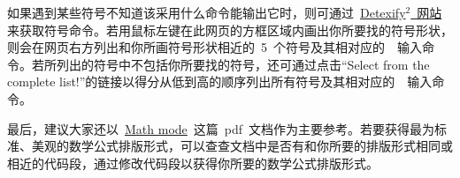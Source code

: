 如果遇到某些符号不知道该采用什么命令能输出它时，则可通过~\href{http://detexify.kirelabs.org/classify.html}{Detexify$^2$~网站}来获取符号命令。若用鼠标左键在此网页的方框区域内画出你所要找的符号形状，则会在网页右方列出和你所画符号形状相近的~5~个符号及其相对应的~\XeLaTeX~输入命令。若所列出的符号中不包括你所要找的符号，还可通过点击“Select from the complete list!”的链接以得分从低到高的顺序列出所有符号及其相对应的~\XeLaTeX~输入命令。

最后，建议大家还以~\href{http://tug.ctan.org/cgi-bin/ctanPackageInformation.py?id=voss-mathmode}{Math mode}~这篇~pdf~文档作为主要参考。若要获得最为标准、美观的数学公式排版形式，可以查查文档中是否有和你所要的排版形式相同或相近的代码段，通过修改代码段以获得你所要的数学公式排版形式。

